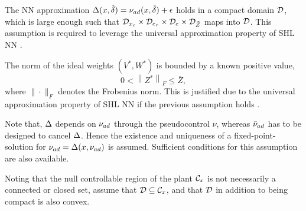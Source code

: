 \begin{assumption}
\label{ass:kcascade:NetworkApproxHolds} The NN approximation
$\Delta(x,\hat{\delta}) = \nu_{ad}(x,\hat{\delta}) + \epsilon$ holds in a compact
domain $\mathcal{D}$, which is large enough such that
$\mathcal{D}_{x_c}\times\mathcal{D}_{e_r}\times\mathcal{D}_{e}\times\mathcal{D}_{\tilde{Z}}$ maps into
$\mathcal{D}$. This assumption is required to leverage the universal approximation property of SHL NN \cite{hornik:itnn:1989}.

\end{assumption}
%
\begin{assumption}
\label{ass:kcascade:IdealWeightsBounded}The norm of the ideal
weights $(V^*,W^*)$ is bounded by a known positive value,
\begin{equation*}
0 < \left\|Z^*\right\|_F \leq \bar{Z},
\end{equation*}
where $\|\cdot\|_F$ denotes the Frobenius norm. This is justified due to the universal approximation property of SHL NN if the previous assumption holds \cite{hornik:itnn:1989}.
\end{assumption}
%
\begin{assumption}
\label{ass:kcascade:FixedPoint}Note that, $\Delta$ depends on $\nu_{ad}$
through the pseudocontrol $\nu$, whereas $\bar{\nu}_{ad}$ has to be designed
to cancel $\Delta$. Hence the existence and uniqueness of a
fixed-point-solution for $\nu_{ad} = \Delta(x,\nu_{ad})$ is assumed.
Sufficient conditions\cite{calise:automatica:2001} for this assumption are
also available.
\end{assumption}

\begin{assumption}
\label{ass:kcascade:nullRegion} Noting that the null controllable region of the plant $\mathcal{C}_{x}$ is not
necessarily a connected or closed set, assume that $\mathcal{D} \subseteq
\mathcal{C}_{x}$, and that $\mathcal{D}$ in addition to being compact is also
convex.
%
\end{assumption}


